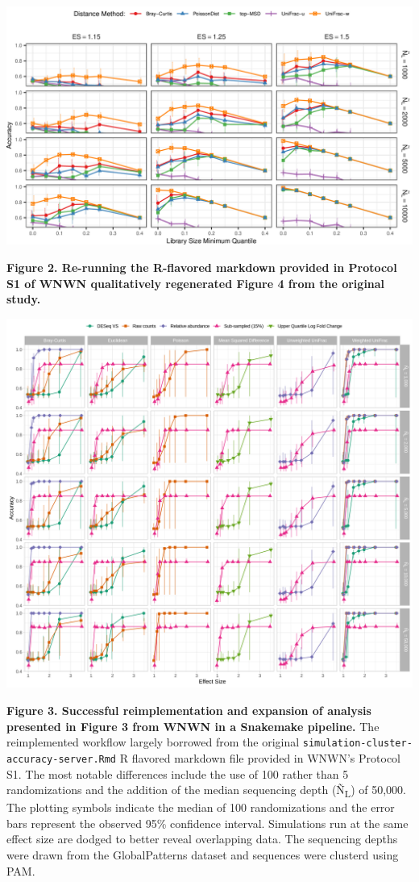 \documentclass[
]{article}
\begin{document}
\includegraphics{figure_02.png}

\textbf{Figure 2. Re-running the R-flavored markdown provided in
Protocol S1 of WNWN qualitatively regenerated Figure 4 from the original
study.}

\newpage

\includegraphics{figure_03.png}

\textbf{Figure 3. Successful reimplementation and expansion of analysis
presented in Figure 3 from WNWN in a Snakemake pipeline.} The
reimplemented workflow largely borrowed from the original
\texttt{simulation-cluster-accuracy-server.Rmd} R flavored markdown file
provided in WNWN's Protocol S1. The most notable differences include the
use of 100 rather than 5 randomizations and the addition of the median
sequencing depth (Ñ\textsubscript{L}) of 50,000. The plotting symbols
indicate the median of 100 randomizations and the error bars represent
the observed 95\% confidence interval. Simulations run at the same
effect size are dodged to better reveal overlapping data. The sequencing
depths were drawn from the GlobalPatterns dataset and sequences were
clusterd using PAM.
\end{document}
